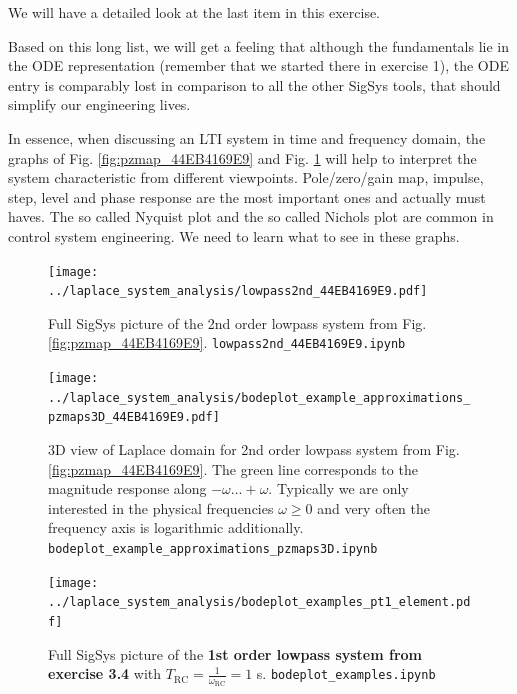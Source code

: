 \documentclass[11pt,a4paper,DIV=12]{scrartcl}
\numberwithin{equation}{section}
\numberwithin{figure}{section}
\newcommand{\fig}[1]{Fig. \ref{#1}} %
\begin{document}
We will have a detailed look at the last item in this exercise.

Based on this long list, we will get a feeling that although the fundamentals
lie in the ODE representation (remember that we started there in exercise 1),
the ODE entry is comparably lost in comparison to all the other SigSys tools,
that should simplify our engineering lives.

\begin{mdframed}
In essence, when discussing an LTI system in time and frequency domain, the
graphs of \fig{fig:pzmap_44EB4169E9} and \fig{fig:lowpass2nd_44EB4169E9}
will help to interpret the system characteristic from different viewpoints.
Pole/zero/gain map, impulse, step, level and phase response are the most important
ones and actually must haves.
The so called Nyquist plot and the so called Nichols plot are common in
control system engineering.
We need to learn what to see in these graphs.
\end{mdframed}




\begin{figure}
  \texttt{[image: ../laplace\_system\_analysis/lowpass2nd\_44EB4169E9.pdf]}
  \caption{Full SigSys picture of the 2nd order lowpass system from
  \fig{fig:pzmap_44EB4169E9}. \texttt{lowpass2nd\_44EB4169E9.ipynb}}
  \label{fig:lowpass2nd_44EB4169E9}
\end{figure}


\begin{figure}
  \texttt{[image: ../laplace\_system\_analysis/bodeplot\_example\_approximations\_pzmaps3D\_44EB4169E9.pdf]}
  \caption{3D view of Laplace domain for 2nd order lowpass system from
  \fig{fig:pzmap_44EB4169E9}.
  The green line corresponds to the magnitude response along $-\omega...+\omega$.
  Typically we are only interested in the physical frequencies $\omega\geq0$ and
  very often the frequency axis is logarithmic additionally.
  \texttt{bodeplot\_example\_approximations\_pzmaps3D.ipynb}}
  \label{fig:bodeplot_example_approximations_pzmaps3D_44EB4169E9}
\end{figure}




\begin{figure}
  \texttt{[image: ../laplace\_system\_analysis/bodeplot\_examples\_pt1\_element.pdf]}
  \caption{Full SigSys picture of the \textbf{1st order lowpass system from
  exercise 3.4} with $T_\mathrm{RC} = \frac{1}{\omega_\mathrm{RC}} = 1$ s.
  \texttt{bodeplot\_examples.ipynb}}
  \label{fig:bodeplot_examples_pt1_element}
\end{figure}
\end{document}
